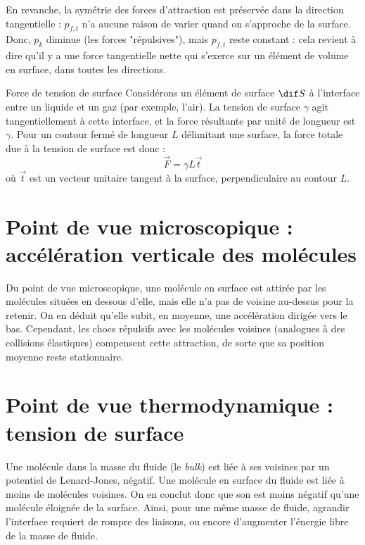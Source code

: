 En revanche, la symétrie des forces d'attraction est préservée dans la direction tangentielle : $p_{f,t}$ n'a aucune raison de varier quand on s'approche de la surface. Donc, $p_k$ diminue (les forces "répulsives"), mais $p_{f,t}$ reste constant : cela revient à dire qu'il y a une force tangentielle nette qui s'exerce sur un élément de volume en surface, dans toutes les directions.

\begin{key}{Force de tension de surface}
Considérons un élément de surface $\dif S$ à l'interface entre un liquide et un gaz (par exemple, l'air). La tension de surface $\gamma$ agit tangentiellement à cette interface, et la force résultante par unité de longueur est $\gamma$. Pour un contour fermé de longueur $L$ délimitant une surface, la force totale due à la tension de surface est donc :
\begin{equation}
  \vec{F} = \gamma L \vec{t}
  \label{eq:tension_surface}
\end{equation}
où $\vec{t}$ est un vecteur unitaire tangent à la surface, perpendiculaire au contour $L$.

\end{key}

\section{Point de vue microscopique : accélération verticale des molécules}

Du point de vue microscopique, une molécule en surface est attirée par les molécules situées en dessous d’elle, mais elle n’a pas de voisine au-dessus pour la retenir. On en déduit qu’elle subit, en moyenne, une accélération dirigée vers le bas. Cependant, les chocs répulsifs avec les molécules voisines (analogues à des collisions élastiques) compensent cette attraction, de sorte que sa position moyenne reste stationnaire.

\section{Point de vue thermodynamique : tension de surface}

Une molécule dans la masse du fluide (le \emph{bulk}) est liée à ses voisines par un potentiel de Lenard-Jones, négatif. Une molécule en surface du fluide est liée à moins de molécules voisines. On en conclut donc que son  est moins négatif qu'une molécule éloignée de la surface. Ainsi, pour une même masse de fluide, agrandir l'interface requiert de rompre des liaisons, ou encore d'augmenter l'énergie libre de la masse de fluide.

